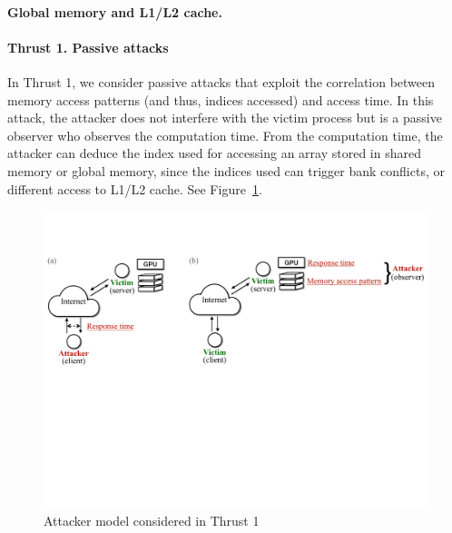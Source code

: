 \paragraph{Global memory and L1/L2 cache.}


\paragraph{Thrust 1. Passive attacks}
In Thrust 1, we consider passive attacks that exploit the correlation between memory access patterns (and thus, indices accessed) and access time.
%
In this attack, the attacker does not interfere with the victim process but is a passive observer who observes the computation time. 
%
From the computation time, the attacker can deduce the index used for accessing an array stored in shared memory or global memory, since the indices used can trigger bank conflicts, or different access to L1/L2 cache. 
%
See Figure~\ref{fig:th1-attack}.
\begin{figure}[h]
    \includegraphics[clip,trim=0 10cm 0 2cm,width=0.72\pdfpagewidth]{figs/thrust1-fig.pdf}
    \caption{Attacker model considered in Thrust 1 }
    \label{fig:th1-attack}
    \end{figure}


